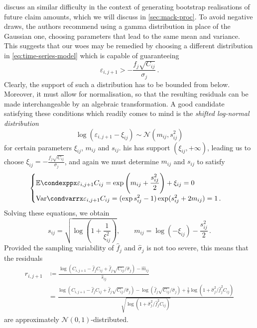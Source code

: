 \documentclass[a4paper]{book}
\begin{document}
\Textcite[238]{england:dist} discuss an similar difficulty in the context of generating bootstrap realisations of future claim amounts, which we will discuss in \cref{sec:mack-proc}. To avoid negative draws, the authors recommend using a gamma distribution in place of the Gaussian one, choosing parameters that lead to the same mean and variance. This suggests that our woes may be remedied by choosing a different distribution in \cref{eq:time-series-model} which is capable of guaranteeing
\begin{equation} \label{eq:lower-limit-err}
  \varepsilon_{i, j + 1} > -\frac{f_j \sqrt{C_{ij}}}{\sigma_j} \,.
\end{equation}
Clearly, the support of such a distribution has to be bounded from below. Moreover, it must allow for normalisation, so that the resulting residuals can be made interchangeable by an algebraic transformation. A good candidate satisfying these conditions which readily comes to mind is the \emph{shifted log-normal distribution}
\begin{equation}
  \log(\varepsilon_{i, j + 1} - \xi_{ij}) \sim \mathcal{N}(m_{ij}, s_{ij}^2)
\end{equation}
for certain parameters $\xi_{ij}$, $m_{ij}$ and $s_{ij}$. his has support $(\xi_{ij}, +\infty)$, leading us to choose $\xi_{ij} = -\frac{f_j \sqrt{C_{ij}}}{\sigma_j}$, and again we must determine $m_{ij}$ and $s_{ij}$ to satisfy
\begin{equation}
  \begin{cases}
    \displaystyle \condexpp{\varepsilon_{i, j + 1}}{C_{ij}} = \exp \left( m_{ij} + \frac{s_{ij}^2}{2} \right) + \xi_{ij} = 0 \\
    \displaystyle \condvarr{\varepsilon_{i, j + 1}}{C_{ij}} = (\exp{s_{ij}^2} - 1) \exp(s_{ij}^2 + 2 m_{ij}) = 1 \,.
  \end{cases}
\end{equation}
Solving these equations, we obtain
\begin{equation}
  s_{ij} = \sqrt{\log \left( 1 + \frac{1}{\xi^2_{ij}} \right)}, \qquad m_{ij} = \log(-\xi_{ij}) - \frac{s^2_{ij}}{2} \,.
\end{equation}
Provided the sampling variability of $\widehat{f}_j$ and $\widehat{\sigma}_j$ is not too severe, this means that the residuals
\begin{align} \label{eq:log-normal-resids}
  r_{i, j + 1}
   & \coloneqq \frac{\log \left( C_{i, j + 1} - \widehat{f}_j C_{ij} + \widehat{f}_j \sqrt{C_{ij}} / \widehat{\sigma}_j \right) - \widehat{m}_{ij}}{\widehat{s}_{ij}}                                                                                                                                                                               \\
   & = \frac{\log \left( C_{i, j + 1} - \widehat{f}_j C_{ij} + \widehat{f}_j \sqrt{C_{ij}} / \widehat{\sigma}_j \right) - \log(\widehat{f}_j \sqrt{C_{ij}} / \widehat{\sigma}_j) + \frac{1}{2} \log \left( 1 + \widehat{\sigma}^2_j / \widehat{f}^2_j C_{ij} \right)}{\sqrt{\log \left( 1 + \widehat{\sigma}^2_j / \widehat{f}^2_j C_{ij} \right)}}
\end{align}
are approximately $\mathcal{N}(0, 1)$-distributed.
\end{document}
